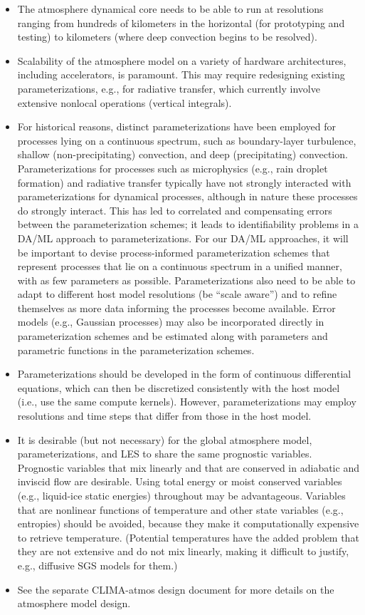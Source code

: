\documentclass{article}
\begin{document}
\begin{itemize}
    \item The atmosphere dynamical core needs to be able to run at resolutions ranging from hundreds of kilometers in the horizontal (for prototyping and testing) to kilometers (where deep convection begins to be resolved).
    \item Scalability of the atmosphere model on a variety of hardware architectures, including accelerators, is paramount. This may require redesigning existing parameterizations, e.g., for radiative transfer, which currently involve extensive nonlocal operations (vertical integrals). 
    \item For historical reasons, distinct parameterizations have been employed for processes lying on a continuous spectrum, such as boundary-layer turbulence, shallow (non-precipitating) convection, and deep (precipitating) convection. Parameterizations for processes such as microphysics (e.g., rain droplet formation) and radiative transfer typically have not strongly interacted with parameterizations for dynamical processes, although in nature these processes do strongly interact. This has led to correlated and compensating errors between the parameterization schemes; it leads to identifiability problems in a DA/ML approach to parameterizations. For our DA/ML approaches, it will be important to devise process-informed parameterization schemes that represent processes that lie on a continuous spectrum in a unified manner, with as few parameters as possible. Parameterizations also need to be able to adapt to different host model resolutions (be ``scale aware'') and to refine themselves as more data informing the processes become available. Error models (e.g., Gaussian processes) may also be incorporated directly in parameterization schemes and be estimated along with parameters and parametric functions in the parameterization schemes. 
    \item Parameterizations should be developed in the form of continuous differential equations, which can then be discretized consistently with the host model (i.e., use the same compute kernels). However, parameterizations may employ resolutions and time steps that differ from those in the host model. 
    \item It is desirable (but not necessary) for the global atmosphere model, parameterizations, and LES to share the same prognostic variables. Prognostic variables that mix linearly and that are conserved in adiabatic and inviscid flow are desirable. Using total energy or moist conserved variables (e.g., liquid-ice static energies) throughout may be advantageous. Variables that are nonlinear functions of temperature and other state variables (e.g., entropies) should be avoided, because they make it computationally expensive to retrieve temperature. (Potential temperatures have the added problem that they are not extensive and do not mix linearly, making it difficult to justify, e.g., diffusive SGS models for them.) 
    \item See the separate CLIMA-atmos design document for more details on the atmosphere model design.
\end{itemize}
\end{document}
